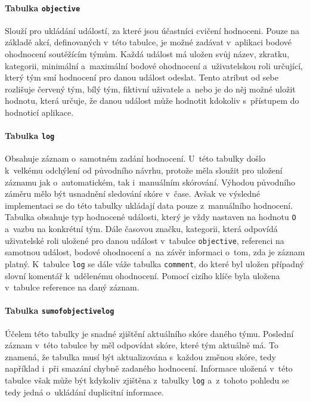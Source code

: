 \documentclass[
  digital,
  twoside,
  table, 
  nolof, 
  nolot
]{fithesis3}
\begin{document}
\paragraph{Tabulka \texttt{objective}} Slouží pro ukládání událostí, za které jsou účastníci cvičení hodnoceni. Pouze na základě akcí, definovaných v~této tabulce, je možné zadávat v~aplikaci bodové ohodnocení soutěžícím týmům. Každá událost má uložen svůj název, zkratku, kategorii, minimální a~maximální bodové ohodnocení a~uživatelskou roli určující, který tým smí hodnocení pro danou událost odeslat. Tento atribut od sebe rozlišuje červený tým, bílý tým, fiktivní uživatele a~nebo je do něj možné uložit hodnotu, která určuje, že danou událost může hodnotit kdokoliv s~přístupem do hodnoticí aplikace.

\paragraph{Tabulka \texttt{log}} Obsahuje záznam o~samotném zadání hodnocení. U~této tabulky došlo k~velkému odchýlení od původního návrhu, protože měla sloužit pro uložení záznamu jak o~automatickém, tak i~manuálním skórování. Výhodou původního záměru mělo být usnadnění sledování skóre v~čase. Avšak ve výsledné implementaci se do této tabulky ukládají data pouze z~manuálního hodnocení. Tabulka obsahuje typ hodnocené události, který je vždy nastaven na hodnotu \texttt{O} a~vazbu na konkrétní tým. Dále časovou značku, kategorii, která odpovídá uživatelské roli uložené pro danou událost v~tabulce \texttt{objective}, referenci na samotnou událost, bodové ohodnocení a~na závěr informaci o~tom, zda je záznam platný. K~tabulce \texttt{log} se dále váže tabulka \texttt{comment}, do které byl uložen případný slovní komentář k~udělenému ohodnocení. Pomocí cizího klíče byla uložena v~tabulce reference na daný záznam.

\paragraph{Tabulka \texttt{sumofobjectivelog}} Účelem této tabulky je snadné zjištění aktuálního skóre daného týmu. Poslední záznam v~této tabulce by měl odpovídat skóre, které tým aktuálně má. To znamená, že tabulka musí být aktualizována s~každou změnou skóre, tedy například i~při smazání chybně zadaného hodnocení. Informace uložená v~této tabulce však může být kdykoliv zjištěna z~tabulky \texttt{log} a~z~tohoto pohledu se tedy jedná o~ukládání duplicitní informace.
\end{document}
